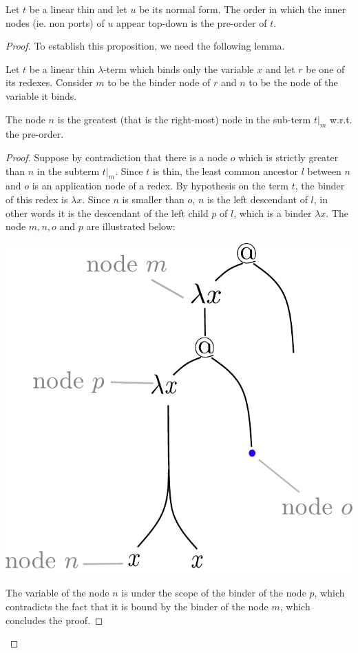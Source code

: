 \begin{proposition}\label{prop:normal-form-depth-first} Let $t$ be a linear thin \lambdaterm and let $u$ be its normal form. 
The order in which the inner nodes (ie. non ports) of $u$ appear top-down is the pre-order of $t$.  
\end{proposition}

\begin{proof}
To establish this proposition, we need the following lemma.
\begin{lemma}\label{lem:internalLemma}
Let $t$ be a linear thin $\lambda$-term which binds only the variable $x$ and let $r$ be one of its redexes. Consider $m$ to be the binder node of $r$ and $n$ to be the node of the variable it binds.

The node $n$ is the greatest (that is the right-most) node in the sub-term $t|_m$ w.r.t. the pre-order. 
\end{lemma}

\begin{proof} Suppose by contradiction that  there is a node $o$ which is strictly greater than $n$ in the subterm $t|_m$.  Since $t$ is thin, the least common ancestor $l$ between $n$ and $o$ is an application node of a redex. By hypothesis on the term $t$, the binder of this redex is $\lambda x$.  Since $n$ is smaller than $o$, $n$ is the left descendant  of $l$, in other words it is the descendant of the left child $p$
of $l$, which is a binder $\lambda x$. The node $m, n, o$ and $p$ are illustrated below:
\begin{center}
		\includegraphics[scale=.3]{pictures/lemma-thin.pdf}
\end{center} 
 The variable of the node $n$ is under the scope of the binder of the node $p$, which contradicts the fact that it is bound by the binder of the node $m$, which concludes the proof. 
\end{proof}


\end{proof}
